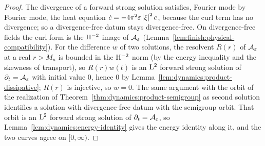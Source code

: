 \begin{proof}
  \leanok
  The divergence of a forward strong solution satisfies, Fourier mode by Fourier mode, the
  heat equation $\dot c=-4\pi^2\varepsilon\left\lvert\xi\right\rvert^2c$, because the curl term has no divergence; so a
  divergence-free datum stays divergence-free.  On divergence-free fields the curl form is the
  $\mathrm{H}^{-2}$ image of $\mathcal A_\varepsilon$ (Lemma~\ref{lem:finish:physical-compatibility}).  For the
  difference $w$ of two solutions, the resolvent $R(r)$ of $\mathcal A_\varepsilon$ at a real $r>M_u$ is
  bounded in the $\mathrm{H}^{-2}$ norm (by the energy inequality and the skewness of transport), so
  $R(r)w(t)$ is an $\mathrm{L}^2$ forward strong solution of $\partial_t=\mathcal A_\varepsilon$ with initial
  value $0$, hence $0$ by Lemma~\ref{lem:dynamics:product-dissipative}; $R(r)$ is injective, so
  $w=0$.  The same argument with the orbit of the realization of
  Theorem~\ref{thm:dynamics:product-semigroup} as second solution identifies a solution with
  divergence-free datum with the semigroup orbit.  That orbit is an $\mathrm{L}^2$ forward strong
  solution of $\partial_t=\mathcal A_\varepsilon$, so Lemma~\ref{lem:dynamics:energy-identity} gives
  the energy identity along it, and the two curves agree on $[0,\infty)$.
\end{proof}
